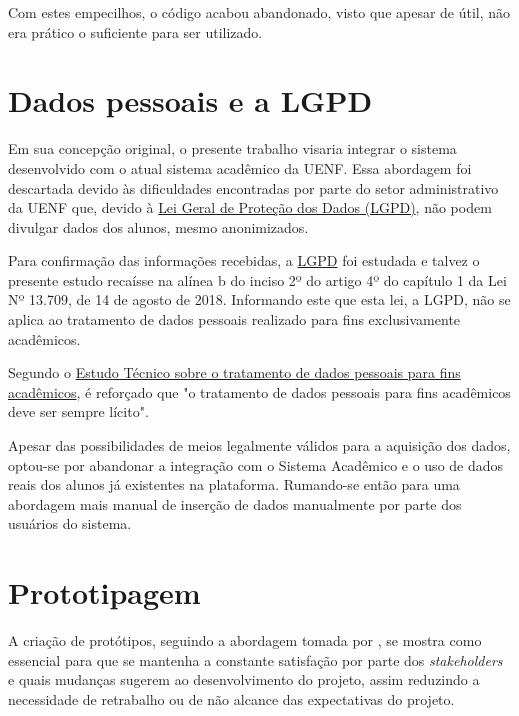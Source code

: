 Com estes empecilhos, o código acabou abandonado, visto que apesar de útil, não era prático o suficiente para ser utilizado.

\section{Dados pessoais e a LGPD} %

Em sua concepção original, o presente trabalho visaria integrar o sistema desenvolvido com o atual sistema acadêmico da UENF. Essa abordagem foi descartada devido às dificuldades encontradas por parte do setor administrativo da UENF que, devido à \href{https://www.planalto.gov.br/ccivil_03/_ato2015-2018/2018/lei/l13709.htm}{Lei Geral de Proteção dos Dados (LGPD)}, não podem divulgar dados dos alunos, mesmo anonimizados.

Para confirmação das informações recebidas, a \href{https://www.planalto.gov.br/ccivil_03/_ato2015-2018/2018/lei/l13709.htm}{LGPD} foi estudada e talvez o presente estudo recaísse na alínea b do inciso 2º do artigo 4º do capítulo 1 da Lei Nº 13.709, de 14 de agosto de 2018. Informando este que esta lei, a LGPD, não se aplica ao tratamento de dados pessoais realizado para fins exclusivamente acadêmicos.

Segundo o \href{https://www.gov.br/anpd/pt-br/assuntos/noticias/sei_00261-000810_2022_17.pdf}{Estudo Técnico sobre o tratamento de dados pessoais para fins acadêmicos}, é reforçado que "o tratamento de dados pessoais para fins acadêmicos deve ser sempre lícito".

Apesar das possibilidades de meios legalmente válidos para a aquisição dos dados, optou-se por abandonar a integração com o Sistema Acadêmico e o uso de dados reais dos alunos já existentes na plataforma. Rumando-se então para uma abordagem mais manual de inserção de dados manualmente por parte dos usuários do sistema.

\section{Prototipagem} %

A criação de protótipos, seguindo a abordagem tomada por \cite{andre_interaction_2018}, se mostra como essencial para que se mantenha a constante satisfação por parte dos \textit{stakeholders} e quais mudanças sugerem ao desenvolvimento do projeto, assim reduzindo a necessidade de retrabalho ou de não alcance das expectativas do projeto.

